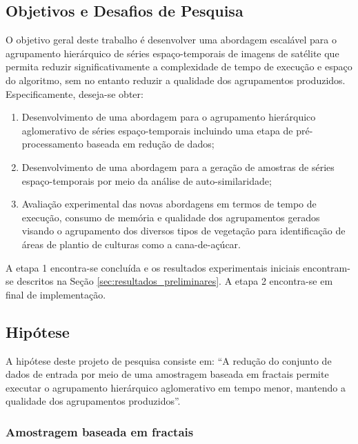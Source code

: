 \subsection{Objetivos e Desafios de Pesquisa}
	\label{subsec:objetivos}

O objetivo geral deste trabalho é desenvolver uma abordagem escalável para o
agrupamento hierárquico de séries espaço-temporais de imagens de satélite que
permita reduzir significativamente a complexidade de tempo de execução e espaço
do algoritmo, sem no entanto reduzir a qualidade dos agrupamentos produzidos.
Especificamente, deseja-se obter:

\begin{enumerate}
    \item Desenvolvimento de uma abordagem para o agrupamento hierárquico
		aglomerativo de séries espaço-temporais incluindo uma etapa de
		pré-processamento baseada em redução de dados;

    \item Desenvolvimento de uma abordagem para a geração de amostras de séries
		espaço-temporais por meio da análise de auto-similaridade;	
    
    \item Avaliação experimental das novas abordagens em termos de tempo de
		execução, consumo de memória e qualidade dos agrupamentos gerados visando o
		agrupamento dos diversos tipos de vegetação para identificação de áreas de
		plantio de culturas como a cana-de-açúcar.
\end{enumerate}

A etapa 1 encontra-se concluída e os resultados experimentais iniciais
encontram-se descritos na Seção \ref{sec:resultados_preliminares}. A
 etapa 2 encontra-se em final de implementação.
	
\subsection{Hipótese}
	\label{subsec:hipotese}

A hipótese deste projeto de pesquisa consiste em: ``A redução do conjunto de
dados de entrada por meio de uma amostragem baseada em fractais permite executar
o agrupamento hierárquico aglomerativo em tempo menor, mantendo a qualidade dos
agrupamentos produzidos''.

\subsubsection{Amostragem baseada em fractais}


